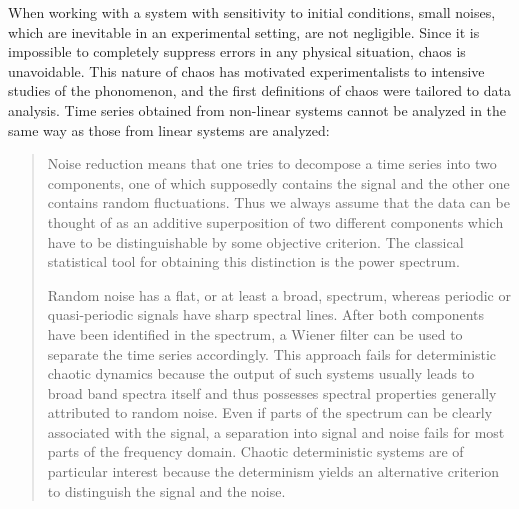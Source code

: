 \documentclass[10pt,twoside,draft]{book}
\begin{document}
When working with a system with sensitivity to initial conditions, small noises, which are inevitable in an experimental setting, are not negligible.
Since it is impossible to completely suppress errors in any physical situation, chaos is unavoidable.
This nature of chaos has motivated experimentalists to intensive studies of the phonomenon, and the first definitions of chaos were tailored to data analysis.
Time series obtained from non-linear systems cannot be analyzed in the same way as those from linear systems are analyzed: 
\begin{quotation}
  Noise reduction means that one tries to decompose a time series into two components, one of which supposedly contains the signal and the other one contains random fluctuations.
  Thus we always assume that the data can be thought of as an additive superposition of two different components which have to be distinguishable by some objective criterion.
  The classical statistical tool for obtaining this distinction is the power spectrum.

  Random noise has a flat, or at least a broad, spectrum, whereas periodic or quasi-periodic signals have sharp spectral lines.
  After both components have been identified in the spectrum, a Wiener filter can be used to separate the time series accordingly.
  This approach fails for deterministic chaotic dynamics because the output of such systems usually leads to broad band spectra itself and thus possesses spectral properties generally attributed to random noise.
  Even if parts of the spectrum can be clearly associated with the signal, a separation into signal and noise fails for most parts of the frequency domain.
  Chaotic deterministic systems are of particular interest because the determinism yields an alternative criterion to distinguish the signal and the noise. 
  \citep[p.51]{kantz-schreiber}
\end{quotation}
\end{document}
